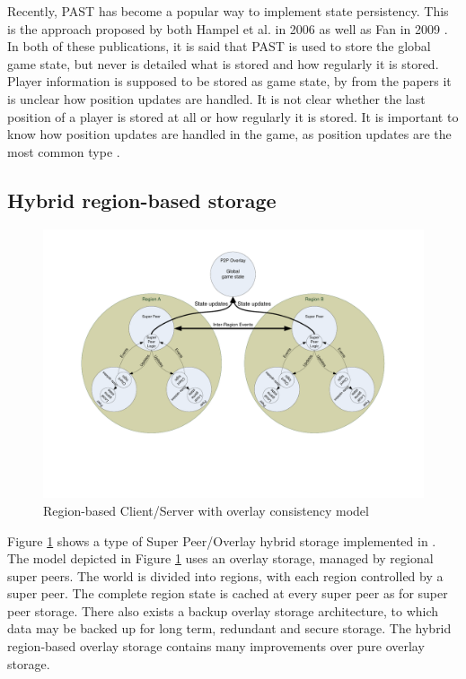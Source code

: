 \documentclass[10pt,a4paper,journal,cspaper,compsoc]{IEEEtran}
\begin{document}
Recently, PAST has become a popular way to implement state persistency. This is the approach proposed by both Hampel et al. in 2006
\cite{past_storage_focus} as well as Fan in 2009 \cite{Fan_phd}. In both of these publications, it is said that PAST is used to store the global game
state, but never is detailed what is stored and how regularly it is stored. Player information is supposed to be stored as game state, by from the
papers it is unclear how position updates are handled. It is not clear whether the last position of a player is stored at all or how regularly it is
stored. It is important to know how position updates are handled in the game, as position updates are the most common type \cite{knutsson_p2p_first}.


\subsection{Hybrid region-based storage}
\label{hybrid_storage}

\begin{figure}[htbp]
 \centering
 \includegraphics[clip=true, viewport=2cm 5cm 27cm 19.5cm, width=\textwidth]{region_based_CS_CM_P2PO}
 \caption{Region-based Client/Server with overlay consistency model}
 \label{fig_cs_region_o_cm}
\end{figure}
%
Figure \ref{fig_cs_region_o_cm} shows a type of Super Peer/Overlay hybrid storage implemented in \cite{zoned_federation}. The model depicted in
Figure \ref{fig_cs_region_o_cm} uses an overlay storage, managed by regional super peers. The world is divided into regions, with each region
controlled by a super peer. The complete region state is cached at every super peer as for super peer storage. There also exists a backup overlay
storage architecture, to which data may be backed up for long term, redundant and secure storage. The hybrid region-based overlay storage contains
many improvements over pure overlay storage.
\end{document}
